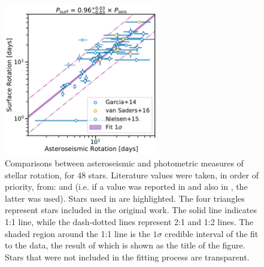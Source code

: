 \documentclass[12pt]{article}
\begin{document}
\begin{figure}
	\centering
	\includegraphics[width=0.6\textwidth]{Images/surf-seis-comparison.pdf}
	\caption{Comparisons between asteroseismic and photometric measures of stellar rotation, for 48 stars. Literature values were taken, in order of priority, from: \cite{garcia+2014} and \cite{nielsen+2013} (i.e. if a value was reported in \cite{nielsen+2013} and also in \cite{garcia+2014}, the latter was used). Stars used in \cite{vansaders+2016} are highlighted. The four triangles represent stars included in the original \cite{nielsen+2015} work. The solid line indicates 1:1 line, while the dash-dotted lines represent 2:1 and 1:2 lines. The shaded region around the 1:1 line is the $1\sigma$ credible interval of the fit to the data, the result of which is shown as the title of the figure. Stars that were not included in the fitting process are transparent.}
	\label{fig:protlit}
\end{figure}
\end{document}
